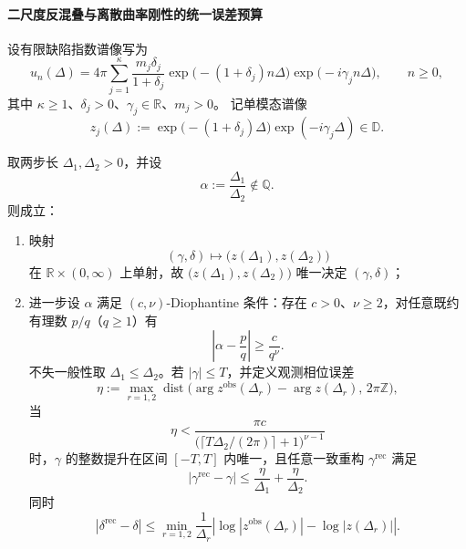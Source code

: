 \paragraph{二尺度反混叠与离散曲率刚性的统一误差预算}
设有限缺陷指数谱像写为
\[
u_n(\Delta)=4\pi\sum_{j=1}^{\kappa}\frac{m_j\delta_j}{1+\delta_j}
\exp\!\bigl(-(1+\delta_j)n\Delta\bigr)\exp\!\bigl(-i\gamma_j n\Delta\bigr),
\qquad n\ge 0,
\]
其中 \(\kappa\ge 1\)、\(\delta_j>0\)、\(\gamma_j\in\mathbb R\)、\(m_j>0\)。
记单模态谱像
\[
z_j(\Delta):=\exp\!\bigl(-(1+\delta_j)\Delta\bigr)\exp(-i\gamma_j\Delta)\in\mathbb D.
\]

\begin{theorem}\label{thm:xi-two-scale-comoving-spectrum-diophantine-threshold}
取两步长 \(\Delta_1,\Delta_2>0\)，并设
\[
\alpha:=\frac{\Delta_1}{\Delta_2}\notin\mathbb Q.
\]
则成立：
\begin{enumerate}
  \item 映射
  \[
  (\gamma,\delta)\longmapsto \bigl(z(\Delta_1),z(\Delta_2)\bigr)
  \]
  在 \(\mathbb R\times(0,\infty)\) 上单射，故 \(\bigl(z(\Delta_1),z(\Delta_2)\bigr)\) 唯一决定 \((\gamma,\delta)\)；
  \item 进一步设 \(\alpha\) 满足 \((c,\nu)\)-Diophantine 条件：存在 \(c>0\)、\(\nu\ge2\)，对任意既约有理数 \(p/q\)（\(q\ge1\)）有
  \[
  \left|\alpha-\frac{p}{q}\right|\ge\frac{c}{q^\nu}.
  \]
  不失一般性取 \(\Delta_1\le\Delta_2\)。若 \(|\gamma|\le T\)，并定义观测相位误差
  \[
  \eta:=\max_{r=1,2}\operatorname{dist}\!\bigl(\arg z^{\mathrm{obs}}(\Delta_r)-\arg z(\Delta_r),\,2\pi\mathbb Z\bigr),
  \]
  当
  \[
  \eta<
  \frac{\pi c}{
  \bigl(\lceil T\Delta_2/(2\pi)\rceil+1\bigr)^{\nu-1}
  }
  \]
  时，\(\gamma\) 的整数提升在区间 \([-T,T]\) 内唯一，且任意一致重构 \(\gamma^{\mathrm{rec}}\) 满足
  \[
  |\gamma^{\mathrm{rec}}-\gamma|
  \le
  \frac{\eta}{\Delta_1}+\frac{\eta}{\Delta_2}.
  \]
  同时
  \[
  |\delta^{\mathrm{rec}}-\delta|
  \le
  \min_{r=1,2}
  \frac{1}{\Delta_r}
  \left|
  \log|z^{\mathrm{obs}}(\Delta_r)|-\log|z(\Delta_r)|
  \right|.
  \]
\end{enumerate}
\end{theorem}
